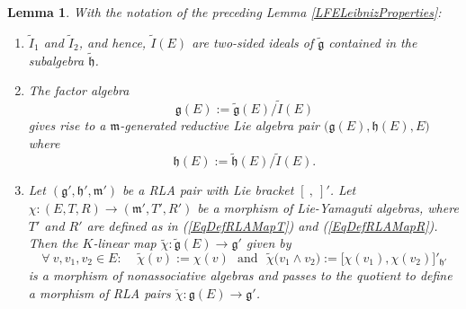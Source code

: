\documentclass [11pt] {article}
\newtheorem {lemma} {Lemma}
\theoremstyle{definition}
\begin{document}
\begin{lemma}\label{LFunctorFComputations}
  	With the notation of the preceding Lemma \ref{LFELeibnizProperties}: 
  	\begin{enumerate}
  		\item $\tilde{I}_1$ and
  	$\tilde{I}_2$, and hence, $\tilde{I}(E)$ are two-sided ideals of
  	$\tilde{\mathfrak{g}}$ contained in the subalgebra $\tilde{\mathfrak{h}}$.
  	\item The factor algebra 
  	\begin{equation}\label{EqDefGE}
  		\mathfrak{g}(E):= 
  		 \tilde{\mathfrak{g}}(E)/\tilde{I}(E)
  	\end{equation}
  	gives rise to a $\mathfrak{m}$-generated reductive Lie algebra pair
  	$\big(\mathfrak{g}(E),\mathfrak{h}(E),E\big)$
  	where
  	\begin{equation}\label{EqDefHE}
  	   \mathfrak{h}(E):= 
  	   \tilde{\mathfrak{h}}(E)/\tilde{I}(E).
  	\end{equation}
  	\item Let $(\mathfrak{g}',\mathfrak{h}',\mathfrak{m}')$
  	be a RLA pair with Lie bracket $[~,~]'$. Let
  	$\chi:(E,T,R)\to (\mathfrak{m}',T',R')$ be a morphism of
  	Lie-Yamaguti algebras, where $T'$ and $R'$ are defined as in (\ref{EqDefRLAMapT}) and (\ref{EqDefRLAMapR}). Then the $K$-linear map $\tilde{\chi}:\tilde{\mathfrak{g}}(E)\to \mathfrak{g}'$ given by 
  	\begin{equation}\label{EqDefFofPsi}
  		\forall~v,v_1,v_2\in E:~~~~~
  	  \tilde{\chi}(v):=\chi(v)~~~\mathrm{and}~~~
  	  \tilde{\chi}\big(v_1\wedge v_2
  	  \big):=
  	   \big[\chi(v_1),\chi(v_2)\big]'_{\mathfrak{h}'}
  	\end{equation}
  	is a morphism of nonassociative algebras and passes to the quotient to define a morphism of RLA pairs $\check{\chi}:\mathfrak{g}(E)\to \mathfrak{g}'$.
  \end{enumerate}
\end{lemma}
\end{document}
